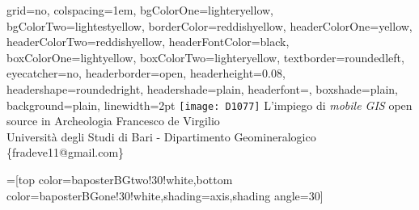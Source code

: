 \documentclass[portrait,final]{baposter}
\begin{document}
\newlength{\leftimgwidth}
\begin{poster}%
  {
  grid=no,
  colspacing=1em,
  bgColorOne=lighteryellow,
  bgColorTwo=lightestyellow,
  borderColor=reddishyellow,
  headerColorOne=yellow,
  headerColorTwo=reddishyellow,
  headerFontColor=black,
  boxColorOne=lightyellow,
  boxColorTwo=lighteryellow,
  textborder=roundedleft,
  eyecatcher=no,
  headerborder=open,
  headerheight=0.08\textheight,
  headershape=roundedright,
  headershade=plain,
  headerfont=\Large\textsf, %
  boxshade=plain,
  background=plain,
  linewidth=2pt
  }
  {\texttt{[image: D1077]}} %
  {\sf %
  L'impiego di \emph{mobile GIS} open source in Archeologia}
  {\sf %
  \vspace{1em}Francesco de Virgilio \\ \small{Università degli Studi di Bari - Dipartimento Geomineralogico \{fradeve11@gmail.com\}}
  }
  {%
  }

  =[top color=baposterBGtwo!30!white,bottom color=baposterBGone!30!white,shading=axis,shading angle=30]

     \setlength{\leftimgwidth}{0.78em+8.0em}


\end{poster}
\end{document}
